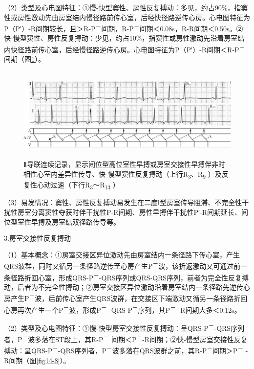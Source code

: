 （2）类型及心电图特征：①慢-快型窦性、房性反复搏动：多见，约占90\%，指窦性或房性激动先由房室结内慢径路前传心室，后经快径路逆传心房。心电图特征为P（P′）-R间期较长，且＞R-P\textsuperscript{－}间期，R-P\textsuperscript{－}间期＜0.08s，R-R间期＜0.50s。②快-慢型窦性、房性反复搏动：少见，约占10\%，指窦性或房性激动先沿着房室结内快径路前传心室，后经慢径路逆传心房。心电图特征为P（P′）-R间期＜R-P\textsuperscript{－}间期（图\ref{fig14-7}）。

\begin{figure}[!htbp]
 \centering
 \includegraphics[width=5.77083in,height=1.84375in]{./images/Image00253.jpg}
 \captionsetup{justification=centering}
 \caption{Ⅱ导联连续记录，显示间位型高位室性早搏或房室交接性早搏伴非时相性心室内差异性传导、快-慢型窦性反复搏动（上行R\textsubscript{3}、R\textsubscript{9} ）及反复性心动过速（下行R\textsubscript{3}～R\textsubscript{13} ）}
 \label{fig14-7}
  \end{figure} 


（3）易发情况：窦性、房性反复搏动易发生在二度Ⅰ型房室传导阻滞、不完全性干扰性房室分离窦性夺获时伴干扰性P-R间期、房性早搏伴干扰性P′-R间期延长、间位型室性早搏及房室结双径路传导等。

3.房室交接性反复搏动

（1）基本概念：①房室交接区异位激动先由房室结内一条径路下传心室，产生QRS波群，同时又循另一条径路逆传至心房产生P\textsuperscript{－}波，该折返激动又可通过前一条径路折回心室，形成QRS-P\textsuperscript{－}-QRS序列或QRS-QRS序列，前者为完全性反复搏动，后者为不完全性搏动；②房室交接区异位激动沿着房室结内一条径路先逆传心房产生P\textsuperscript{－}波，后前传心室产生QRS波群，在交接区下端激动又循另一条径路折回心房再次产生一个P\textsuperscript{－}波，形成P\textsuperscript{－} -QRS-P\textsuperscript{－}序列，其P\textsuperscript{－} -R间期大多＜0.12s。

（2）类型及心电图特征：①慢-快型房室交接性反复搏动：呈QRS-P\textsuperscript{－}-QRS序列者，P\textsuperscript{－}波多落在ST段上，其R-P\textsuperscript{－} 间期＜P\textsuperscript{－}-R间期；②快-慢型房室交接性反复搏动：呈QRS-P\textsuperscript{－}-QRS序列者，P\textsuperscript{－}波多落在QRS波群之前，其R-P\textsuperscript{－}间期＞P\textsuperscript{－} -R间期（图\ref{fig14-8}）。

